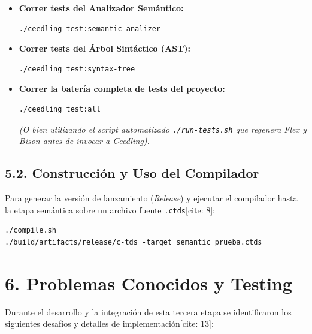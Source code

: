 \documentclass[12pt, a4paper]{article}
\begin{document}
\begin{itemize}
    \item \textbf{Correr tests del Analizador Semántico:}
\begin{verbatim}
./ceedling test:semantic-analizer
\end{verbatim}
    \item \textbf{Correr tests del Árbol Sintáctico (AST):}
\begin{verbatim}
./ceedling test:syntax-tree
\end{verbatim}
    \item \textbf{Correr la batería completa de tests del proyecto:}
\begin{verbatim}
./ceedling test:all
\end{verbatim}
    \textit{(O bien utilizando el script automatizado \texttt{./run-tests.sh} que regenera Flex y Bison antes de invocar a Ceedling).}
\end{itemize}

\subsection*{5.2. Construcción y Uso del Compilador}
Para generar la versión de lanzamiento (\textit{Release}) y ejecutar el compilador hasta la etapa semántica sobre un archivo fuente \texttt{.ctds}[cite: 8]:
\begin{verbatim}
./compile.sh
./build/artifacts/release/c-tds -target semantic prueba.ctds
\end{verbatim}

\section{6. Problemas Conocidos y Testing}
Durante el desarrollo y la integración de esta tercera etapa se identificaron los siguientes desafíos y detalles de implementación[cite: 13]:
\end{document}
